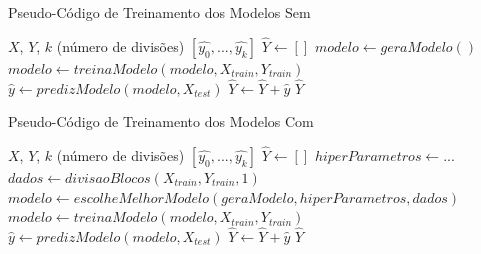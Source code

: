 \begin{algorithm}
\label{algo:training}
\caption{Pseudo-Código de Treinamento dos Modelos Sem }
\begin{algorithmic}
\REQUIRE $X$, $Y$, $k$ (número de divisões)
\ENSURE $[\hat{y_0}, ..., \hat{y_k}]$
\STATE $\hat{Y} \leftarrow [] $
\newline
{} 
    \STATE $modelo \leftarrow geraModelo()$
    \STATE $modelo \leftarrow treinaModelo(modelo, X_{train}, Y_{train})$ 
    \newline
    \STATE $\hat{y} \leftarrow predizModelo(modelo, X_{test}) $
    \STATE $\hat{Y} \leftarrow \hat{Y} + \hat{y}$
\ENDFOR
\newline
\RETURN $\hat{Y}$
\end{algorithmic}
\end{algorithm}

\begin{algorithm}
\label{algo:tuned_training}
\caption{Pseudo-Código de Treinamento dos Modelos Com }
\begin{algorithmic}
\REQUIRE $X$, $Y$, $k$ (número de divisões)
\ENSURE $[\hat{y_0}, ..., \hat{y_k}]$
\STATE $\hat{Y} \leftarrow [] $ 
\newline
{} 
    \STATE $hiperParametros \leftarrow {...}$
    \STATE $dados \leftarrow divisaoBlocos(X_{train}, Y_{train}, 1)$
    \STATE $modelo \leftarrow escolheMelhorModelo(geraModelo, hiperParametros, dados)$
    \newline
    \STATE $modelo \leftarrow treinaModelo(modelo, X_{train}, Y_{train})$ 
    \newline
    \STATE $\hat{y} \leftarrow predizModelo(modelo, X_{test}) $
    \STATE $\hat{Y} \leftarrow \hat{Y} + \hat{y}$
    \newline
\ENDFOR
\newline
\RETURN $\hat{Y}$
\end{algorithmic}
\end{algorithm}